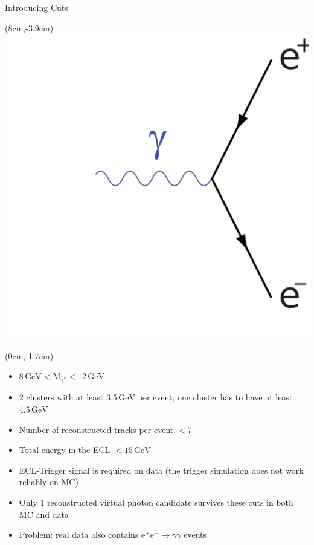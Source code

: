 \documentclass[8pt]{beamer}
\begin{document}
\begin{frame}{Introducing Cuts}
	
	\begin{textblock*}{3cm}(8cm,-3.9cm)
		\includegraphics[width=\textwidth]{VBilder/bha2}
	\end{textblock*}
	
	
	\begin{textblock*}{11cm}(0cm,-1.7cm)
	\begin{itemize}
		\item<3-> $8\,\textrm{GeV} < \textrm{M}_{\gamma^*} < 12\,\textrm{GeV}$
		\item<3-> 2 clusters with at least $3.5\,\textrm{GeV}$ per event; one cluster has to have at least $4.5\,\textrm{GeV}$
		\item<3-> Number of reconstructed tracks per event $< 7$
		\item<3-> Total energy in the ECL $< 15\,\textrm{GeV}$
		\item<3-> ECL-Trigger signal is required on data (the trigger simulation does not work reliably on MC)
		\item<4-> Only 1 reconstructed virtual photon candidate survives these cuts in both MC and data 
		\item<5-> Problem: real data also contains $\textrm{e}^+ \textrm{e}^- \rightarrow \gamma \gamma$ events
	\end{itemize}


\end{textblock*}
\end{frame}
\end{document}
